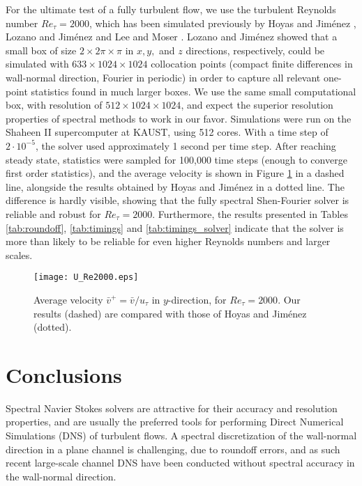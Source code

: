 \documentclass[preprint]{elsarticle}
\newcommand{\D}[1]{\bar{#1}}
\begin{document}
For the ultimate test of a fully turbulent flow, we use the turbulent Reynolds number $Re_{\tau}=2000$, which has been simulated previously by Hoyas and Jim\'{e}nez \cite{hoyas06}, Lozano and Jim\'{e}nez \cite{Lozano2014} and Lee and Moser \cite{leemoser15}. Lozano and Jim\'{e}nez showed that a small box  of size $2 \times 2\pi \times \pi$ in $x, y,$ and $z$ directions, respectively, could be simulated with $633 \times 1024 \times 1024$ collocation points (compact finite differences in wall-normal direction, Fourier in periodic) in order to capture all relevant one-point statistics found in much larger boxes. We use the same small computational box, with resolution of $512 \times 1024 \times 1024$, and expect the superior resolution properties of spectral methods to work in our favor. Simulations were run on the Shaheen II supercomputer at KAUST, using 512 cores. With a time step of $2\cdot10^{-5}$, the solver used approximately 1 second per time step. After reaching steady state, statistics were sampled for 100,000 time steps (enough to converge first order statistics), and the average velocity is shown in Figure \ref{fig:U_mean} in a dashed line, alongside the results obtained by Hoyas and Jim\'{e}nez \cite{hoyas06} in a dotted line. The difference is hardly visible, showing that the fully spectral Shen-Fourier solver is reliable and robust for $Re_{\tau} = 2000$. Furthermore, the results presented in Tables \ref{tab:roundoff}, \ref{tab:timings} and \ref{tab:timings_solver} indicate that the solver is more than likely to be reliable for even higher Reynolds numbers and larger scales.

\begin{figure}[t]
	\begin{center}
	\texttt{[image: U\_Re2000.eps]}
	\caption{Average velocity $\D{v}^+ = \D{v}/u_{\tau}$ in $y$-direction, for $Re_{\tau}=2000$. Our results (dashed) are compared with those of Hoyas and Jim\'{e}nez \cite{hoyas06} (dotted).}
	\label{fig:U_mean}
	\end{center}
\end{figure}

\section{Conclusions}
Spectral Navier Stokes solvers are attractive for their accuracy and resolution 
properties, and are usually the preferred tools for performing Direct Numerical 
Simulations (DNS) of turbulent flows. A spectral discretization of the wall-normal 
direction in a plane channel is challenging, due to roundoff errors, and as such recent large-scale channel DNS 
have been conducted without spectral accuracy in the wall-normal direction. 
\end{document}
